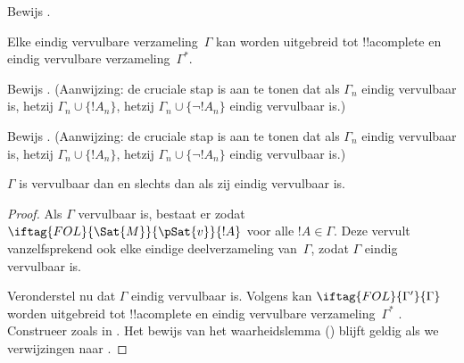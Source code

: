\documentclass[openany]{memoir}
\begin{document}
\begin{prob}
Bewijs .
\end{prob}
\tagendprob

\begin{lem}
 Elke eindig vervulbare verzameling~$\Gamma$
kan worden uitgebreid tot !!a{complete} en eindig vervulbare
verzameling~$\Gamma^*$.
\end{lem}

\begin{prob}
Bewijs . (Aanwijzing: de cruciale
stap is aan te tonen dat als $\Gamma_n$ eindig vervulbaar is, hetzij
$\Gamma_n \cup \{!A_n\}$, hetzij $\Gamma_n \cup \{\lnot !A_n\}$
eindig vervulbaar is.)
\end{prob}
\tagendprob

\begin{prob}
Bewijs . (Aanwijzing: de cruciale
stap is aan te tonen dat als $\Gamma_n$ eindig vervulbaar is, hetzij
$\Gamma_n \cup \{!A_n\}$, hetzij $\Gamma_n \cup \{\lnot !A_n\}$
eindig vervulbaar is.)
\end{prob}
\tagendprob

\begin{thm}[Compactheid]
 $\Gamma$ is vervulbaar dan en slechts
dan als zij eindig vervulbaar is.
\end{thm}

\begin{proof}
Als $\Gamma$ vervulbaar is, bestaat er
zodat $\iftag{FOL}{\Sat{M}}{\pSat{v}}{!A}$ voor alle $!A \in \Gamma$.
Deze  vervult vanzelfsprekend ook
elke eindige deelverzameling van~$\Gamma$, zodat $\Gamma$ eindig
vervulbaar is.

Veronderstel nu dat $\Gamma$ eindig vervulbaar is. Volgens
 kan $\iftag{FOL}{\Gamma'}{\Gamma}$ worden
uitgebreid tot !!a{complete} en eindig vervulbare verzameling~$\Gamma^*$
. Construeer
zoals in . Het bewijs van het
waarheidslemma () blijft geldig als we verwijzingen
naar .
\end{proof}
\end{document}
